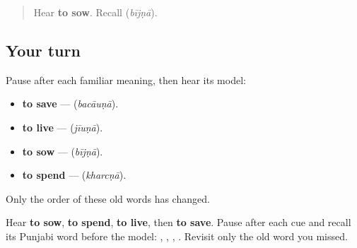 \begin{quote}
Hear \textbf{to sow}. Recall \textbf{} (\emph{bījṇā}).
\end{quote}

\subsection*{Your turn}
Pause after each familiar meaning, then hear its model:

\begin{itemize}
\raggedright
  \item \textbf{to save} — \textbf{} (\emph{bacāuṇā}).
  \item \textbf{to live} — \textbf{} (\emph{jīuṇā}).
  \item \textbf{to sow} — \textbf{} (\emph{bījṇā}).
  \item \textbf{to spend} — \textbf{} (\emph{kharcṇā}).
\end{itemize}

Only the order of these old words has changed.

\begin{tcolorbox}[breakable,colback=teal!4,colframe=teal!35!black,title={Before you move on}]
Hear \textbf{to sow}, \textbf{to spend}, \textbf{to live}, then \textbf{to save}. Pause after each cue and recall its Punjabi word before the model: \textbf{}, \textbf{}, \textbf{}, \textbf{}. Revisit only the old word you missed.
\end{tcolorbox}
